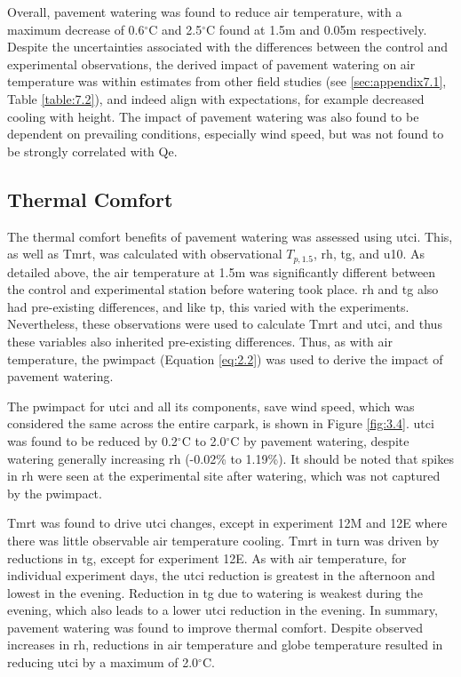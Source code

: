 \documentclass[final,3p,times,authoryear]{elsarticle}
\begin{document}
Overall, pavement watering was found to reduce air temperature, with a maximum decrease of 0.6$^{\circ}$C and 2.5$^{\circ}$C found at 1.5m and 0.05m respectively. Despite the uncertainties associated with the differences between the control and experimental observations, the derived impact of pavement watering on air temperature was within estimates from other field studies (see \ref{sec:appendix7.1}, Table \ref{table:7.2}), and indeed align with expectations, for example decreased cooling with height. The impact of pavement watering was also found to be dependent on prevailing conditions, especially wind speed, but was not found to be strongly correlated with \gls{Qe}.

\subsection{Thermal Comfort}\label{sec:discussion3.2}

The thermal comfort benefits of pavement watering was assessed using \gls{utci}. This, as well as \gls{Tmrt}, was calculated with observational $T_{p,1.5}$, \gls{rh}, \gls{tg}, and \gls{u10}. As detailed above, the air temperature at 1.5m was significantly different between the control and experimental station before watering took place. \gls{rh} and \gls{tg} also had pre-existing differences, and like \gls{tp}, this varied with the experiments. Nevertheless, these observations were used to calculate \gls{Tmrt} and \gls{utci}, and thus these variables also inherited pre-existing differences. Thus, as with air temperature, the \gls{pwimpact} (Equation \ref{eq:2.2}) was used to derive the impact of pavement watering.

The \gls{pwimpact} for \gls{utci} and all its components, save wind speed, which was considered the same across the entire carpark, is shown in Figure \ref{fig:3.4}. \gls{utci} was found to be reduced by 0.2$^{\circ}$C to 2.0$^{\circ}$C by pavement watering, despite watering generally increasing \gls{rh} (-0.02\% to 1.19\%). It should be noted that spikes in \gls{rh} were seen at the experimental site after watering, which was not captured by the \gls{pwimpact}. 

\gls{Tmrt} was found to drive \gls{utci} changes, except in experiment 12M and 12E where there was little observable air temperature cooling. \gls{Tmrt} in turn was driven by reductions in \gls{tg}, except for experiment 12E. As with air temperature, for individual experiment days, the \gls{utci} reduction is greatest in the afternoon and lowest in the evening. Reduction in \gls{tg} due to watering is weakest during the evening, which also leads to a lower \gls{utci} reduction in the evening. In summary, pavement watering was found to improve thermal comfort. Despite observed increases in \gls{rh}, reductions in air temperature and globe temperature resulted in reducing \gls{utci} by a maximum of 2.0$^{\circ}$C.
\end{document}
